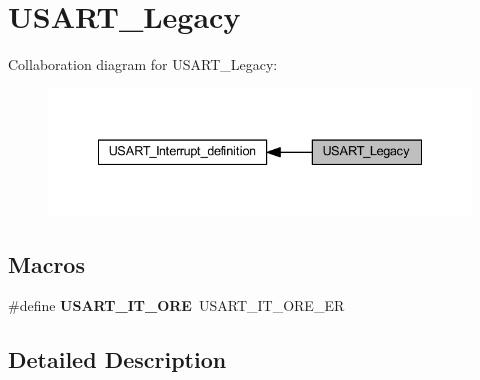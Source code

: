 \hypertarget{group___u_s_a_r_t___legacy}{}\section{U\+S\+A\+R\+T\+\_\+\+Legacy}
\label{group___u_s_a_r_t___legacy}
Collaboration diagram for U\+S\+A\+R\+T\+\_\+\+Legacy\+:
\nopagebreak
\begin{figure}[H]
\begin{center}
\leavevmode
\includegraphics[width=335pt]{group___u_s_a_r_t___legacy}
\end{center}
\end{figure}
\subsection*{Macros}
\begin{DoxyCompactItemize}
\item 
\mbox{\label{group___u_s_a_r_t___legacy_ga8b7d40e02a81be787fbb325bbe6dfbeb}} 
\#define {\bfseries U\+S\+A\+R\+T\+\_\+\+I\+T\+\_\+\+O\+RE}~U\+S\+A\+R\+T\+\_\+\+I\+T\+\_\+\+O\+R\+E\+\_\+\+ER
\end{DoxyCompactItemize}


\subsection{Detailed Description}
